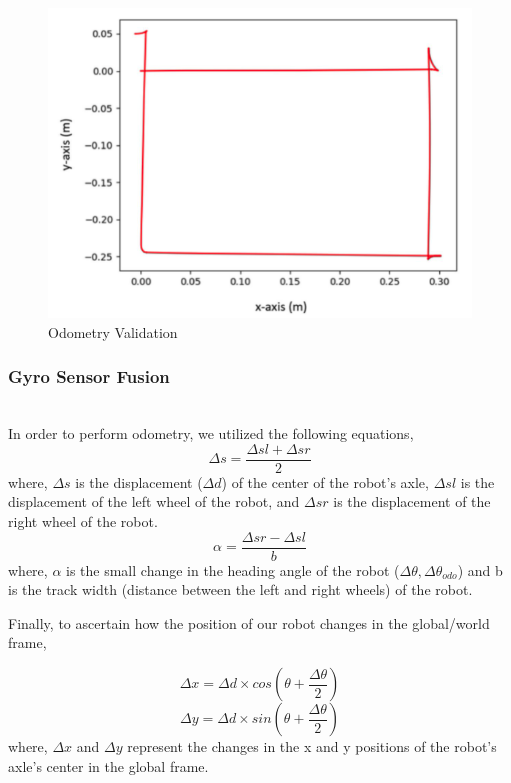 \documentclass[journal]{IEEEtran}
\begin{document}
\begin{figure}[h]
\begin{center}
\includegraphics[width=0.9\linewidth]{image_1/figure_1_3.jpg}
\end{center}
   \caption{Odometry Validation}
   \label{figure_1_3}
\end{figure}



\subsubsection{Gyro Sensor Fusion}  \hfill\\

In order to perform odometry, we utilized the following equations,
$$\Delta s = \dfrac{\Delta sl+\Delta sr}{2}$$
where, $\Delta s$ is the displacement ($\Delta d$) of the center of the robot’s axle, $\Delta sl$ is the displacement of the left wheel of the robot, and $\Delta sr$ is the  displacement of the right wheel of the robot.
$$\alpha = \dfrac{\Delta sr -\Delta sl}{b}$$
where, $\alpha$ is the small change in the heading angle of the robot ($\Delta \theta, \Delta \theta_{odo}$) and b is the track width (distance between the left and right wheels) of the robot.

Finally, to ascertain how the position of our robot changes in the global/world frame,

$$\Delta x = \Delta d \times cos(\theta + \dfrac{\Delta \theta}{2})$$
$$\Delta y = \Delta d \times sin(\theta + \dfrac{\Delta \theta}{2})$$
where, $\Delta x$ and $\Delta y$ represent the changes in the x and y positions of the robot’s axle’s center in the global frame.\\
\end{document}
